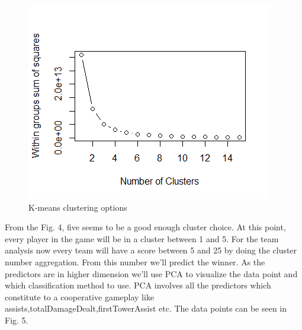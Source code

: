 \documentclass[conference]{IEEEtran}
\begin{document}
\begin{itemize}
\begin{figure}[!t]
\includegraphics[width=\linewidth]{tab4}
\caption{K-means clustering options}
\end{figure}

 From the Fig. 4, five seems to be a good enough cluster choice. At this point, every player in the game will be in a cluster between 1 and 5. For the team analysis now every team will have a score between 5 and 25 by doing the cluster number aggregation. From this number we’ll predict the winner. As the predictors are in higher dimension we’ll use PCA to visualize the data point and which classification method to use. PCA involves all the predictors which constitute to a cooperative gameplay like assists,totalDamageDealt,firstTowerAssist etc. The data points can be seen in Fig. 5.


\end{itemize}
\end{document}
